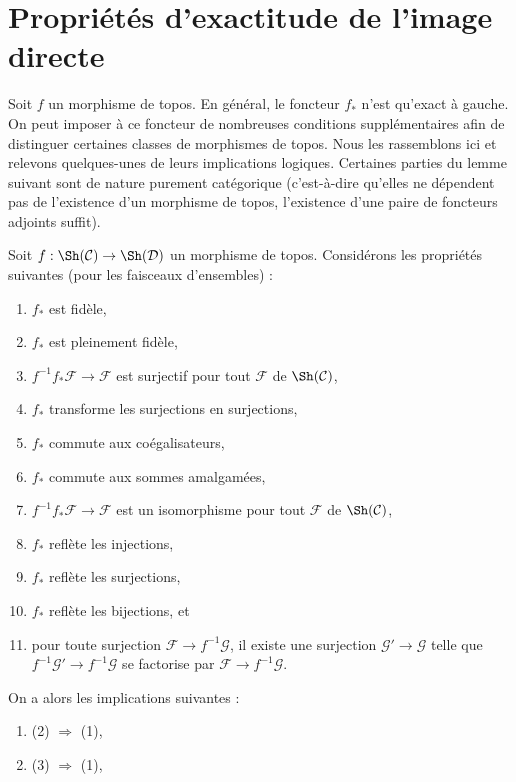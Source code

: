 \section{Propriétés d’exactitude de l’image directe}
\label{section-pushforward}

\noindent
Soit $f$ un morphisme de topos. En général, le foncteur $f_*$ n’est
qu’exact à gauche. On peut imposer à ce foncteur de nombreuses conditions
supplémentaires afin de distinguer certaines classes de morphismes de topos.
Nous les rassemblons ici et relevons quelques-unes de leurs implications logiques.
Certaines parties du lemme suivant sont de nature purement catégorique (c’est-à-dire
qu’elles ne dépendent pas de l’existence d’un morphisme de topos, l’existence d’une paire
de foncteurs adjoints suffit).

\begin{lemma}
\label{lemma-exactness-properties}
Soit $f : \Sh(\mathcal{C}) \to \Sh(\mathcal{D})$ un
morphisme de topos. Considérons les propriétés suivantes (pour les faisceaux
d’ensembles) :
\begin{enumerate}
\item $f_*$ est fidèle,
\item $f_*$ est pleinement fidèle,
\item $f^{-1}f_*\mathcal{F} \to \mathcal{F}$ est surjectif pour
tout $\mathcal{F}$ de $\Sh(\mathcal{C})$,
\item $f_*$ transforme les surjections en surjections,
\item $f_*$ commute aux coégalisateurs,
\item $f_*$ commute aux sommes amalgamées,
\item $f^{-1}f_*\mathcal{F} \to \mathcal{F}$ est un isomorphisme pour
tout $\mathcal{F}$ de $\Sh(\mathcal{C})$,
\item $f_*$ reflète les injections,
\item $f_*$ reflète les surjections,
\item $f_*$ reflète les bijections, et
\item pour toute surjection $\mathcal{F} \to f^{-1}\mathcal{G}$, il
existe une surjection $\mathcal{G}' \to \mathcal{G}$ telle que
$f^{-1}\mathcal{G}' \to f^{-1}\mathcal{G}$ se factorise par
$\mathcal{F} \to f^{-1}\mathcal{G}$.
\end{enumerate}
On a alors les implications suivantes :
\begin{enumerate}
\item[(a)] (2) $\Rightarrow$ (1),
\item[(b)] (3) $\Rightarrow$ (1),

\end{enumerate}
\end{lemma}
